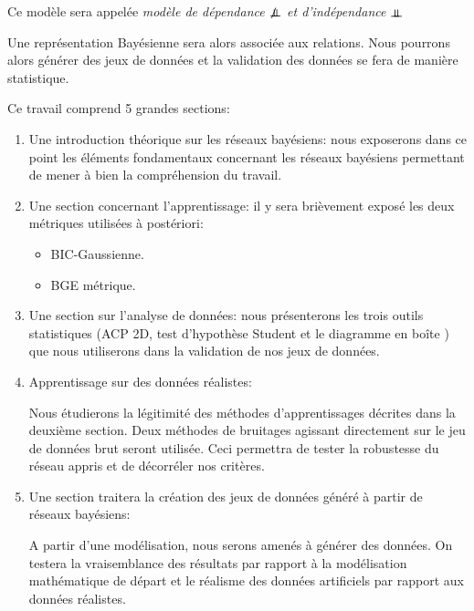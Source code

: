 \documentclass[a4paper]{article}
\begin{document}
Ce modèle sera appelée \textit{modèle de dépendance $\not\perp\!\!\!\perp$ et d'indépendance $\perp\!\!\!\perp$}

Une représentation Bayésienne sera alors associée aux relations.
Nous pourrons alors générer des jeux de données et la validation des données  se fera de manière statistique.

Ce travail comprend 5 grandes sections:

\begin{enumerate}

  \item Une introduction théorique sur les réseaux bayésiens: nous exposerons dans ce point les éléments fondamentaux concernant les réseaux bayésiens permettant de mener à bien la compréhension du travail.

  \item Une section concernant l'apprentissage: il y sera brièvement  exposé les deux métriques utilisées à postériori:
\begin{itemize}	
    \item BIC-Gaussienne.

   \item BGE métrique.

\end{itemize}
  \item Une section sur l'analyse de données:
    nous présenterons les  trois outils statistiques (ACP 2D, test d'hypothèse Student et le diagramme en boîte ) que nous utiliserons dans la validation de nos jeux de données.



  \item Apprentissage sur des données réalistes:

    Nous étudierons la légitimité des méthodes d'apprentissages décrites dans la deuxième section.
    Deux méthodes de bruitages agissant directement sur le jeu de données brut seront utilisée.
    Ceci permettra de tester la robustesse du réseau appris et de décorréler nos critères.

  \item Une section traitera la création des jeux de données généré à partir de réseaux bayésiens:

    A partir d'une modélisation,
    nous serons amenés à générer des données.
    On testera la vraisemblance des résultats par rapport à la modélisation mathématique de départ et le réalisme des données artificiels par rapport aux données réalistes.

\end{enumerate}
   
\end{document}
